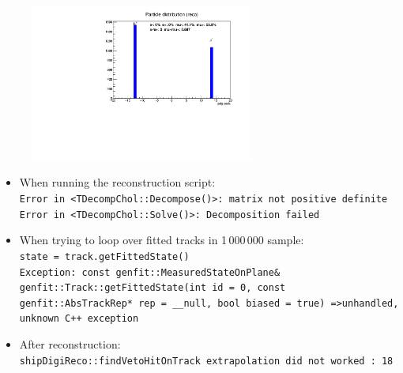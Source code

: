 \begin{frame}[t]{}
  \begin{figure}
    \centering
    \includegraphics[width=0.65\textwidth]{../hists/nofield/allP/reco_pdg.pdf}
  \end{figure}
\end{frame}

\begin{frame}[t]{}
  \begin{itemize}
    \item When running the reconstruction script: \\
          \texttt{Error in <TDecompChol::Decompose()>: matrix not positive definite \\ Error in <TDecompChol::Solve()>: Decomposition failed} \\
    \item When trying to loop over fitted tracks in 1\,000\,000 sample: \\
          \texttt{state = track.getFittedState() \\ Exception: const genfit::MeasuredStateOnPlane\& genfit::Track::getFittedState(int id = 0, const genfit::AbsTrackRep* rep = \_\_null, bool biased = true) =>unhandled, unknown C++ exception} \\
    \item After reconstruction: \\\texttt{shipDigiReco::findVetoHitOnTrack extrapolation did not worked : 18}
  \end{itemize}
\end{frame}



